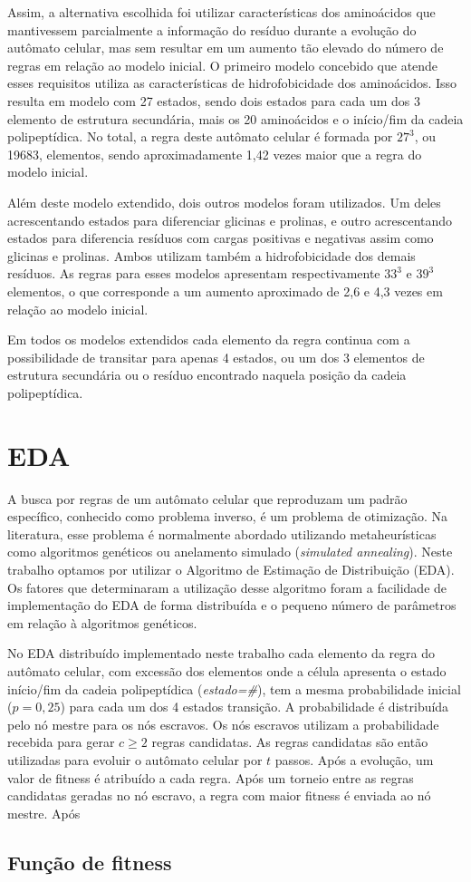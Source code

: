 Assim, a alternativa escolhida foi utilizar características dos aminoácidos que mantivessem parcialmente a informação do resíduo durante a evolução do autômato celular, mas sem resultar em um aumento tão elevado do número de regras em relação ao modelo inicial. O primeiro modelo concebido que atende esses requisitos utiliza as características de hidrofobicidade dos aminoácidos. Isso resulta em modelo com 27 estados, sendo dois estados para cada um dos 3 elemento de estrutura secundária, mais os 20 aminoácidos e o início/fim da cadeia polipeptídica. No total, a regra deste autômato celular é formada por  $27^3$, ou 19683, elementos, sendo aproximadamente 1,42 vezes maior que a regra do modelo inicial.

Além deste modelo extendido, dois outros modelos foram utilizados. Um deles acrescentando estados para diferenciar glicinas e prolinas, e outro acrescentando estados para diferencia resíduos com cargas positivas e negativas assim como glicinas e prolinas. Ambos utilizam também a hidrofobicidade dos demais resíduos. As regras para esses modelos apresentam  respectivamente $33^3$ e $39^3$ elementos, o que corresponde a um aumento aproximado de 2,6 e 4,3 vezes em relação ao modelo inicial. 

Em todos os modelos extendidos cada elemento da regra continua com a possibilidade de transitar para apenas 4 estados, ou um dos 3 elementos de estrutura secundária ou o resíduo encontrado naquela posição da cadeia polipeptídica.

\section{EDA}

A busca por regras de um autômato celular que reproduzam um padrão específico, conhecido como problema inverso, é um problema de otimização. Na literatura, esse problema é normalmente abordado utilizando metaheurísticas como algoritmos genéticos ou anelamento simulado (\textit{simulated annealing}). Neste trabalho optamos por utilizar o Algoritmo de Estimação de Distribuição (EDA). Os fatores que determinaram a utilização desse algoritmo foram a facilidade de implementação do EDA de forma distribuída e o pequeno número de parâmetros em relação à algoritmos genéticos.

No EDA distribuído implementado neste trabalho cada elemento da regra do autômato celular, com excessão dos elementos onde a célula apresenta o estado início/fim da cadeia polipeptídica (\textit{estado=\#}),  tem a mesma probabilidade inicial ($p=0,25$) para cada um dos 4 estados transição. A probabilidade é distribuída pelo nó mestre para os nós escravos. Os nós escravos utilizam a probabilidade recebida para gerar $c \ge 2 $ regras candidatas. As regras candidatas são então utilizadas para evoluir o autômato celular por $t$ passos. Após a evolução, um valor de fitness é atribuído a cada regra. Após um torneio entre as regras candidatas geradas no nó escravo, a regra com maior fitness é enviada ao nó mestre. Após 

\subsection{Função de fitness}